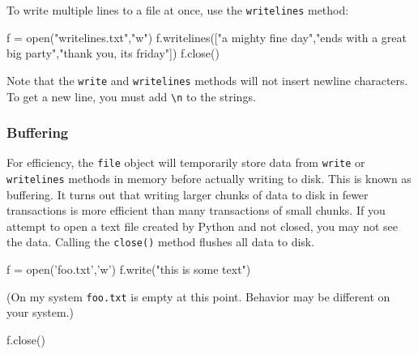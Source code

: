 \documentclass[12pt]{article} \newif\ifsolution\solutiontrue %
\begin{document}
To write multiple lines to a file at once, use the \texttt{writelines}
method:

\begin{python}
f = open("writelines.txt","w") f.writelines(["a mighty fine day\n","ends with a great big party\n","thank you, its friday\n"]) f.close()
\end{python}

\begin{python}
\OperatorTok{%
\end{python}


Note that the \texttt{write} and \texttt{writelines} methods will not
insert newline characters. To get a new line, you must add
\texttt{\textquotesingle{}\textbackslash{}n\textquotesingle{}} to the
strings.

\subsubsection{Buffering}\label{buffering}

For efficiency, the \texttt{file} object will temporarily store data
from \texttt{write} or \texttt{writelines} methods in memory before
actually writing to disk. This is known as buffering. It turns out that
writing larger chunks of data to disk in fewer transactions is more
efficient than many transactions of small chunks. If you attempt to open
a text file created by Python and not closed, you may not see the data.
Calling the \texttt{close()} method flushes all data to disk.

\begin{python}
f = open('foo.txt','w') f.write("this is some text\n")
\end{python}


(On my system \texttt{foo.txt} is empty at this point. Behavior may be
different on your system.)

\begin{python}
f.close()
\end{python}

 
\end{document}
